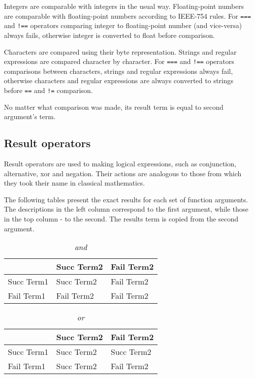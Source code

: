Integers are comparable with integers in the usual way. Floating-point numbers are comparable with floating-point numbers according to IEEE-754\cite{IEEE754} rules. For \lstinline{===} and \lstinline{!==} operators comparing integer to floating-point number (and vice-versa) always fails, otherwise integer is converted to float before comparison.

Characters are compared using their byte representation. Strings and regular expressions are compared character by character. For \lstinline{===} and \lstinline{!==} operators comparisons between characters, strings and regular expressions always fail, otherwise characters and regular expressions are always converted to strings before \lstinline{==} and \lstinline{!=} comparison.

No matter what comparison was made, its result term is equal to second argument's term.

\subsection{Result operators}

Result operators are used to making logical expressions, such as conjunction, alternative, xor and negation. Their actions are analogous to those from which they took their name in classical mathematics.

The following tables present the exact results for each set of function arguments. The descriptions in the left column correspond to the first argument, while those in the top column - to the second. The results term is copied from the second argument.

\begin{bnfutils}
  \begin{table}[ht]
    \caption{\emph{and}}
    \begin{center}
    \begin{tabular}[t]{l|l|l}
       & Succ Term2 & Fail Term2 \\
      \hline
      Succ Term1 & Succ Term2 & Fail Term2 \\
      Fail Term1 & Fail Term2 & Fail Term2 
    \end{tabular}
    \end{center}
  \end{table}
\end{bnfutils}

\begin{bnfutils}
  \begin{table}[ht]
    \caption{\emph{or}}
    \begin{center}
    \begin{tabular}[t]{l|l|l}
        & Succ Term2 & Fail Term2 \\
      \hline
      Succ Term1 & Succ Term2 & Succ Term2 \\
      Fail Term1 & Succ Term2 & Fail Term2 
    \end{tabular}
    \end{center}
  \end{table}
\end{bnfutils}

